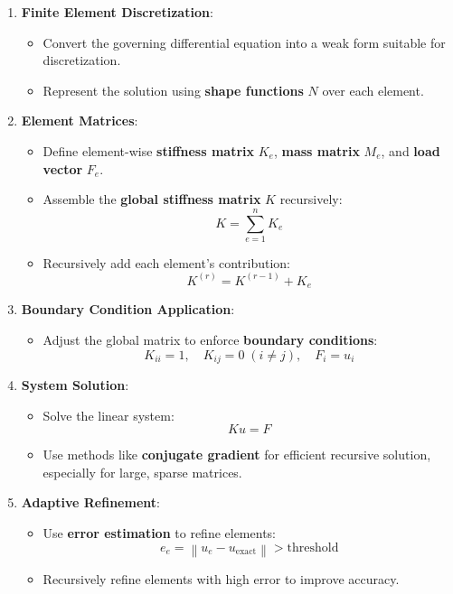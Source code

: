 \documentclass{article}
\begin{document}
\begin{enumerate}
    \item \textbf{Finite Element Discretization}:
    \begin{itemize}
        \item Convert the governing differential equation into a weak form suitable for discretization.
        \item Represent the solution using \textbf{shape functions} \( N \) over each element.
    \end{itemize}

    \item \textbf{Element Matrices}:
    \begin{itemize}
        \item Define element-wise \textbf{stiffness matrix} \( K_e \), \textbf{mass matrix} \( M_e \), and \textbf{load vector} \( F_e \).
        \item Assemble the \textbf{global stiffness matrix} \( K \) recursively:
        \[
        K = \sum_{e=1}^{n} K_e
        \]
        \item Recursively add each element's contribution:
        \[
        K^{(r)} = K^{(r-1)} + K_e
        \]
    \end{itemize}

    \item \textbf{Boundary Condition Application}:
    \begin{itemize}
        \item Adjust the global matrix to enforce \textbf{boundary conditions}:
        \[
        K_{ii} = 1, \quad K_{ij} = 0 \; (i \neq j), \quad F_i = u_i
        \]
    \end{itemize}

    \item \textbf{System Solution}:
    \begin{itemize}
        \item Solve the linear system:
        \[
        K u = F
        \]
        \item Use methods like \textbf{conjugate gradient} for efficient recursive solution, especially for large, sparse matrices.
    \end{itemize}

    \item \textbf{Adaptive Refinement}:
    \begin{itemize}
        \item Use \textbf{error estimation} to refine elements:
        \[
        e_e = \left\lVert u_e - u_{\text{exact}} \right\rVert > \text{threshold}
        \]
        \item Recursively refine elements with high error to improve accuracy.
    \end{itemize}
\end{enumerate}
\end{document}
